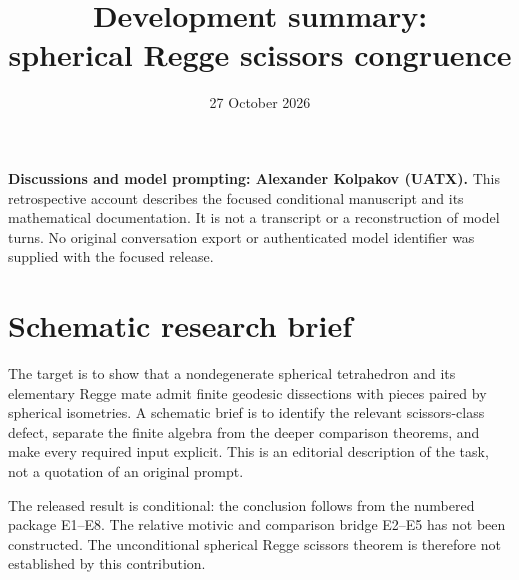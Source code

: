 \documentclass[11pt]{article}
\title{Development summary:\\spherical Regge scissors congruence}
\author{}
\date{27 October 2026}
\begin{document}
\maketitle
\noindent\textbf{Discussions and model prompting: Alexander Kolpakov (UATX).}
This retrospective account describes the focused conditional manuscript and
its mathematical documentation. It is not a transcript or a reconstruction
of model turns. No original conversation export or authenticated model
identifier was supplied with the focused release.

\section*{Schematic research brief}
The target is to show that a nondegenerate spherical tetrahedron and its
elementary Regge mate admit finite geodesic dissections with pieces paired
by spherical isometries. A schematic brief is to identify the relevant
scissors-class defect, separate the finite algebra from the deeper
comparison theorems, and make every required input explicit. This is an
editorial description of the task, not a quotation of an original prompt.

The released result is conditional: the conclusion follows from the
numbered package E1--E8. The relative motivic and comparison bridge E2--E5
has not been constructed. The unconditional spherical Regge scissors
theorem is therefore not established by this contribution.
\end{document}
